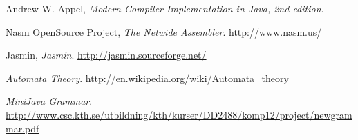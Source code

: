 \documentclass[11pt]{amsart}
\begin{document}
\begin{thebibliography}{9}

	Andrew W. Appel,
	\emph{Modern Compiler Implementation in Java, 2nd edition}.

	Nasm OpenSource Project,
	\emph{The Netwide Assembler}.
	\url{http://www.nasm.us/}

	Jasmin,
	\emph{Jasmin}.
	\url{http://jasmin.sourceforge.net/}

	\emph{Automata Theory}.
	\url{http://en.wikipedia.org/wiki/Automata_theory}

	\emph{MiniJava Grammar}.
	\url{http://www.csc.kth.se/utbildning/kth/kurser/DD2488/komp12/project/newgrammar.pdf}

\end{thebibliography}
\end{document}
